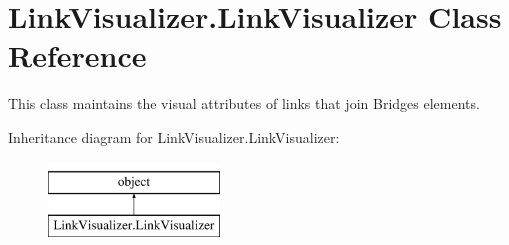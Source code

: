 \hypertarget{class_link_visualizer_1_1_link_visualizer}{}\section{Link\+Visualizer.\+Link\+Visualizer Class Reference}
\label{class_link_visualizer_1_1_link_visualizer}


This class maintains the visual attributes of links that join Bridges elements.  


Inheritance diagram for Link\+Visualizer.\+Link\+Visualizer\+:\begin{figure}[H]
\begin{center}
\leavevmode
\includegraphics[height=2.000000cm]{class_link_visualizer_1_1_link_visualizer}
\end{center}
\end{figure}
